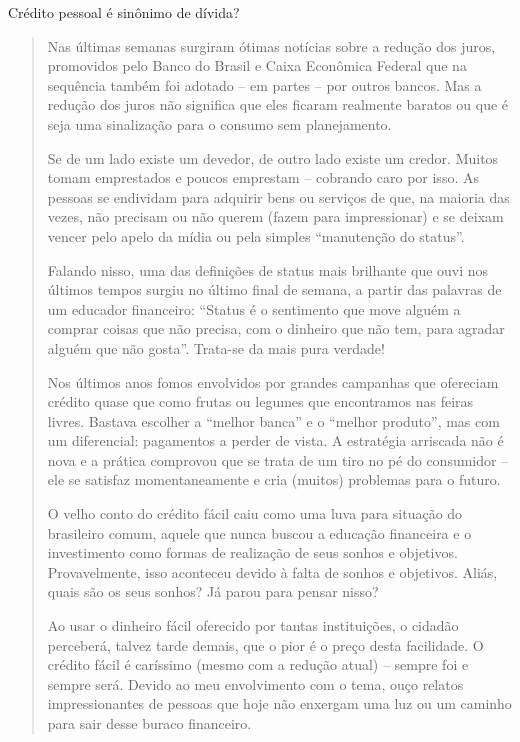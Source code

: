 \begin{task}{Crédito pessoal é sinônimo de dívida?}

\begin{quote}
Nas últimas semanas surgiram ótimas notícias sobre a redução dos juros, promovidos pelo Banco do Brasil e Caixa Econômica Federal que na sequência também foi adotado – em partes – por outros bancos. Mas a redução dos juros não significa que eles ficaram realmente baratos ou que é seja uma sinalização para o consumo sem planejamento.

Se de um lado existe um devedor, de outro lado existe um credor. Muitos tomam emprestados e poucos emprestam – cobrando caro por isso. As pessoas se endividam para adquirir bens ou serviços de que, na maioria das vezes, não precisam ou não querem (fazem para impressionar) e se deixam vencer pelo apelo da mídia ou pela simples “manutenção do status”.

Falando nisso, uma das definições de status mais brilhante que ouvi nos últimos tempos surgiu no último final de semana, a partir das palavras de um educador financeiro: “Status é o sentimento que move alguém a comprar coisas que não precisa, com o dinheiro que não tem, para agradar alguém que não gosta”. Trata-se da mais pura verdade!

Nos últimos anos fomos envolvidos por grandes campanhas que ofereciam crédito quase que como frutas ou legumes que encontramos nas feiras livres. Bastava escolher a “melhor banca” e o “melhor produto”, mas com um diferencial: pagamentos a perder de vista. A estratégia arriscada não é nova e a prática comprovou que se trata de um tiro no pé do consumidor – ele se satisfaz momentaneamente e cria (muitos) problemas para o futuro.

O velho conto do crédito fácil caiu como uma luva para situação do brasileiro comum, aquele que nunca buscou a educação financeira e o investimento como formas de realização de seus sonhos e objetivos. Provavelmente, isso aconteceu devido à falta de sonhos e objetivos. Aliás, quais são os seus sonhos? Já parou para pensar nisso?

Ao usar o dinheiro fácil oferecido por tantas instituições, o cidadão perceberá, talvez tarde demais, que o pior é o preço desta facilidade. O crédito fácil é caríssimo (mesmo com a redução atual) – sempre foi e sempre será. Devido ao meu envolvimento com o tema, ouço relatos impressionantes de pessoas que hoje não enxergam uma luz ou um caminho para sair desse buraco financeiro.


\end{quote}
\end{task}
